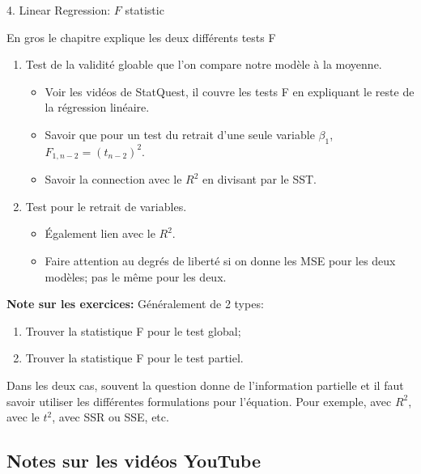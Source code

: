 \documentclass[12pt, titlepage, french]{report}
\begin{document}
\begin{CHPT_SUMM}{4. Linear Regression: $F$ statistic}
En gros le chapitre explique les deux différents tests F
\begin{enumerate}
	\item	Test de la validité gloable que l'on compare notre modèle à la moyenne.
	\begin{itemize}
		\item	Voir les vidéos de StatQuest, il couvre les tests F en expliquant le reste de la régression linéaire.
		\item	Savoir que pour un test du retrait d'une seule variable $\beta_{1}$, $F_{1, n - 2} = (t_{n - 2})^{2}$.
		\item	Savoir la connection avec le $R^{2}$ en divisant par le SST.
	\end{itemize}
	\item	Test pour le retrait de variables.
	\begin{itemize}
		\item	Également lien avec le $R^{2}$.
		\item	Faire attention au degrés de liberté si on donne les MSE pour les deux modèles; pas le même pour les deux.
	\end{itemize}
\end{enumerate}
\textbf{Note sur les exercices:} Généralement de 2 types:
\begin{enumerate}
	\item	Trouver la statistique F pour le test global;
	\item	Trouver la statistique F pour le test partiel. 
\end{enumerate}
Dans les deux cas, souvent la question donne de l'information partielle et il faut savoir utiliser les différentes formulations pour l'équation. Pour exemple, avec $R^{2}$, avec le $t^{2}$, avec SSR ou SSE, etc.
\end{CHPT_SUMM}

\subsection{Notes sur les vidéos YouTube}
\end{document}
